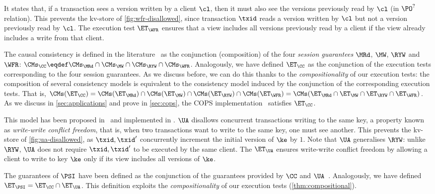

It states that, if a transaction sees a version written by a
client $\cl$, then it must also see the versions previously read by $\cl$ (in $\PO^?$ relation).
This prevents the kv-store of \cref{fig:wfr-disallowed},
since transaction $\txid$ reads a version written by $\cl$ but
not a version previously read by $\cl$.
The execution test $\ET_{\WFR}$ ensures
that a view includes all versions previously read by a client 
if the view already includes a write from that client. 


The causal consistency is defined in the literature~\cite{session2causal} 
as the conjunction (composition) of the four \emph{session guarantees} \(\MRd\), \(\MW\), \(\RYW\) and \(\WFR\):   
$\CMs_{\CC} \eqdef \CMs_{\MRd} \cap \CMs_{\MW} \cap \CMs_{\RYW} \cap \CMs_{\WFR}$. 
Analogously, we have defined $\ET_\CC$ as the conjunction of the execution tests corresponding to the four session guarantees.
As we discuss before, we can do this thanks to the \emph{compositionality} of our execution tests:
the composition of several consistency models is equivalent to the consistency model induced by the conjunction of the corresponding execution tests. 
That is, $\CMs(\ET_\CC) = \CMs(\ET_{\MRd}) \cap \CMs(\ET_{\MW}) \cap
\CMs(\ET_{\RYW}) \cap \CMs(\ET_{\WFR}) = \CMs(\ET_{\MRd} \cap
\ET_{\MW} \cap \ET_{\RYW} \cap \ET_{\WFR})$.
As we discuss in \cref{sec:applications} and prove in \ref{sec:cops}, the COPS
implementation~\cite{cops} satisfies $\ET_{\CC}$. 

This model has been proposed in~\cite{framework-concur} 
and implemented in \cite{rola}.
$\UA$ disallows concurrent transactions writing to the same key,
a property known as \emph{write-write conflict freedom}, that is, 
when two transactions want to write to the same key, one must see another.
This prevents the kv-store of \cref{fig:ua-disallowed},
as $\txid, \txid'$ concurrently increment the initial version of $\ke$ by $1$.
Note that $\UA$ generalises $\RYW$: unlike $\RYW$, $\UA$ does not require $\txid, \txid'$ to be executed by the same client.
The $\ET_\UA$ ensures write-write conflict freedom by allowing a client to write to key $\ke$
only if its view includes all versions of $\ke$.

The guarantees of $\PSI$ have been defined as the conjunction of the guarantees provided by $\CC$ and $\UA$~\cite{framework-concur}.
Analogously, we have defined $\ET_\PSI = \ET_\CC \cap \ET_\UA$. 
This definition exploits the \emph{compositionality} of our execution tests (\cref{thm:compositional}).

